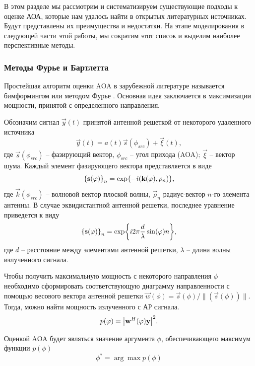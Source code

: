 В этом разделе мы рассмотрим и систематизируем существующие подходы к оценке
АОА, которые нам удалось найти в открытых литературных источниках.  Будут
представлены их преимущества и недостатки.  На этапе моделирования в следующей
части этой работы, мы сократим этот список и выделим наиболее перспективные
методы.

\subsubsection{Методы Фурье и Бартлетта}
\label{sec:3.2.1}

Простейшая алгоритм оценки AOA в зарубежной литературе называется бимформингом \cite{Tuncer2009, Stoica2005} или методом Фурье \cite{Allen2006}.
Основная идея заключается в максимизации мощности, принятой с определенного
направления.

Обозначим сигнал $\vec{y}(t)$ принятой антенной решеткой от некоторого
удаленного источника
\begin{equation}
    \label{eq:3.1}
    \vec{y}(t) = a(t) \vec{s}(\phi_{src}) + \vec{\xi}(t),
\end{equation}
где ${\vec{s}(\phi_{src})}$ -- фазирующий вектор,
$\phi_{src}$ -- угол прихода (AOA); $\vec \xi$ -- вектор шума.
Каждый элемент фазирующего вектора представляется в виде
\begin{equation}
    \qty{\vec{s}(\phi)}_n = \exp{-i(\vec k (\phi), \vec \rho_n)},
\end{equation}
где $\vec k (\phi_{src})$ -- волновой вектор плоской волны, $\vec\rho_n$ радиус-вектор
$n$-го элемента антенны.
В случае эквидистантной антенной решетки, последнее уравнение приведется
к виду
\begin{equation}
    \qty{\vec s(\phi)}_n = \exp{i2\pi\frac{d}{\lambda}\sin(\phi)n},
\end{equation}
где $d$ -- расстояние между элементами антенной решетки, $\lambda$ -- длина
волны излученного сигнала.

Чтобы получить максимальную мощность с некоторого направления $\phi$ необходимо
сформировать соответствующую диаграмму направленности с помощью
весового вектора антенной решетки $\vec w (\phi) = \vec s(\phi)/\rVert(\vec
    s(\phi))\lVert$.  Тогда, можно найти мощность излученного с АР сигнала.
\begin{equation}
    p(\phi) = \abs{\vec w^H (\phi) \vec y}^2.
\end{equation}

Оценкой AOA будет являться значение аргумента $\phi$, обеспечивающего максимум функции $p(\phi)$
\begin{equation}
    \phi^* = \arg\max p(\phi)
\end{equation}

